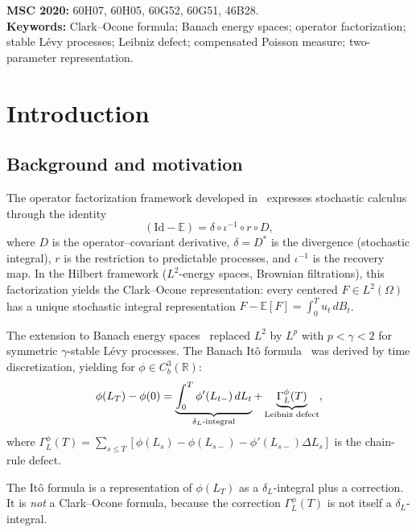 \documentclass[11pt,a4paper]{article}
\theoremstyle{plain}
\theoremstyle{definition}
\theoremstyle{remark}
\newcommand{\Id}{\mathrm{Id}}
\newcommand{\E}{\mathbb{E}}
\newcommand{\R}{\mathbb{R}}
\begin{document}
\medskip
\noindent\textbf{MSC 2020:} 60H07, 60H05, 60G52, 60G51, 46B28.\\
\textbf{Keywords:} Clark--Ocone formula; Banach energy spaces;
operator factorization; stable L\'evy processes;
Leibniz defect; compensated Poisson measure;
two-parameter representation.


\section{Introduction}\label{sec:intro}

\subsection{Background and motivation}

The operator factorization framework developed
in~\cite{Fontes2026a,Fontes2026b,Fontes2026c} expresses
stochastic calculus through the identity
\begin{equation}\label{eq:factorization}
  (\Id - \E) = \delta \circ \iota^{-1} \circ r \circ D,
\end{equation}
where $D$ is the operator--covariant derivative, $\delta = D^*$
is the divergence (stochastic integral), $r$ is the restriction
to predictable processes, and $\iota^{-1}$ is the recovery map.
In the Hilbert framework ($L^2$-energy spaces, Brownian filtrations),
this factorization yields the Clark--Ocone representation: every
centered $F \in L^2(\Omega)$ has a unique stochastic integral
representation $F - \E[F] = \int_0^T u_t\,dB_t$.

The extension to Banach energy spaces~\cite{Fontes2026d}
replaced $L^2$ by $L^p$ with $p < \gamma < 2$ for symmetric
$\gamma$-stable L\'evy processes.  The Banach
It\^o formula~\cite{Fontes2026f} was derived by time
discretization, yielding for $\phi \in C_b^3(\R)$:
\begin{equation}\label{eq:banach-ito}
  \phi(L_T) - \phi(0)
  = \underbrace{\int_0^T \phi'(L_{t-})\,dL_t}_{%
  \text{$\delta_L$-integral}}
  + \underbrace{\Gamma_L^{\phi}(T)}_{%
  \text{Leibniz defect}},
\end{equation}
where $\Gamma_L^{\phi}(T) = \sum_{s \leq T}
[\phi(L_s) - \phi(L_{s-}) - \phi'(L_{s-})\Delta L_s]$ is the
chain-rule defect.

The It\^o formula is a representation of $\phi(L_T)$ as a
$\delta_L$-integral plus a correction.  It is \emph{not} a
Clark--Ocone formula, because the correction
$\Gamma_L^{\phi}(T)$ is not itself a $\delta_L$-integral.
\end{document}
